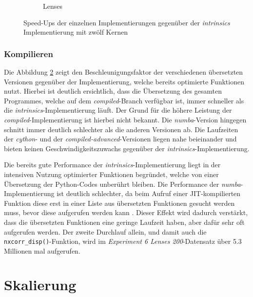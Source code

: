\begin{center}
\begin{figure}[h]
\begin{subfigure}[b]{0.54\textwidth}
			\caption{Lenses}
			\label{fig:speedups_lenses}
		\end{subfigure}
		\caption{Speed-Ups der einzelnen Implementierungen gegenüber der \textit{intrinsics} Implementierung mit zwölf Kernen}
		\label{fig:speedups}
	\end{figure}
\end{center}

\subsubsection{Kompilieren}

Die Abbildung \ref{fig:speedups} zeigt den Beschleunigungsfaktor der verschiedenen übersetzten Versionen gegenüber der Implementierung, welche bereits optimierte Funktionen nutzt. Hierbei ist deutlich ersichtlich, dass die Übersetzung des gesamten Programmes, welche auf dem \textit{compiled}-Branch verfügbar ist, immer schneller als die \textit{intrinsics}-Implementierung läuft. Der Grund für die höhere Leistung der \textit{compiled}-Implementierung ist hierbei nicht bekannt. Die \textit{numba}-Version hingegen schnitt immer deutlich schlechter als die anderen Versionen ab. Die Laufzeiten der \textit{cython}- und der \textit{compiled-advanced}-Versionen liegen nahe beieinander und bieten keinen Geschwindigkeitszuwachs gegenüber der \textit{intrinsics}-Implementierung. 

Die bereits gute Performance der \textit{intrinsics}-Implementierung liegt in der intensiven Nutzung optimierter Funktionen begründet, welche von einer Übersetzung der Python-Codes unberührt bleiben. Die Performance der \textit{numba}-Implementierung ist deutlich schlechter, da beim Aufruf einer \gls{JIT}-kompilierten Funktion diese erst in einer Liste aus übersetzten Funktionen gesucht werden muss, bevor diese aufgerufen werden kann \cite{PKA17}. Dieser Effekt wird dadurch verstärkt, dass die übersetzten Funktionen eine geringe Laufzeit haben, aber dafür sehr oft aufgerufen werden. Der zweite Durchlauf allein, und damit auch die \texttt{nxcorr\_disp()}-Funktion, wird im \textit{Experiment 6 Lenses 200}-Datensatz über 5.3 Millionen mal aufgerufen. 

\section{Skalierung}

